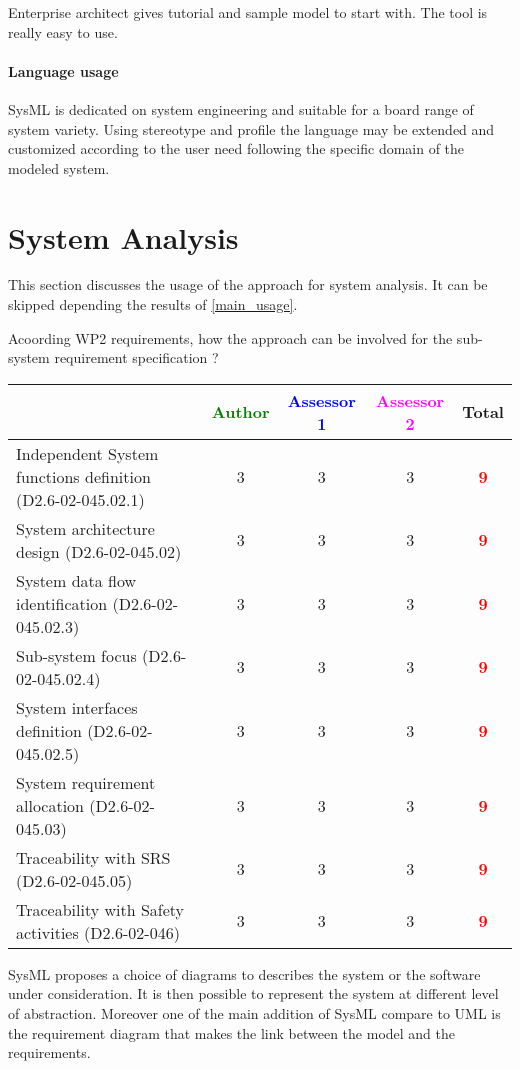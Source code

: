 Enterprise architect gives tutorial and sample model to start
with. The tool is really easy to use.

\paragraph{Language usage} 
SysML is dedicated on system engineering and suitable for a board range of
system variety. Using stereotype and profile the language may be
extended and customized according to the user need following the
specific domain of the modeled system.


\section{System Analysis}
This section discusses the usage of the approach for system analysis.
It can be skipped depending the results of \ref{main_usage}.

Acoording WP2 requirements, how the approach can be involved for the sub-system requirement specification ?

\begin{tabular}{|l | c | c | c | c|}
\hline
& \textcolor{green}{Author} & \textcolor{blue}{Assessor 1} & \textcolor{magenta}{Assessor 2} & Total \\
\hline
Independent System functions definition (D2.6-02-045.02.1)  &3 & 3   & 3    & \textcolor{red}{\textbf{9}} \\
\hline 
System architecture design (D2.6-02-045.02) &3 & 3   & 3   & \textcolor{red}{\textbf{9}} \\
\hline
System data flow identification (D2.6-02-045.02.3)  &3 & 3   & 3   & \textcolor{red}{\textbf{9}} \\
\hline
Sub-system focus (D2.6-02-045.02.4)  &3 & 3   & 3   & \textcolor{red}{\textbf{9}} \\
\hline
System interfaces definition (D2.6-02-045.02.5)  &3 & 3   & 3   & \textcolor{red}{\textbf{9}} \\
\hline
System requirement allocation (D2.6-02-045.03)  &3 & 3   & 3   & \textcolor{red}{\textbf{9}}  \\
\hline
Traceability with SRS (D2.6-02-045.05)  &3 & 3   & 3   & \textcolor{red}{\textbf{9}}  \\
\hline
Traceability with Safety activities (D2.6-02-046)  &3 & 3   & 3   & \textcolor{red}{\textbf{9}} \\
\hline
\end{tabular}
\begin{author_comment}
  SysML proposes a choice of diagrams to describes the system or the
  software under consideration. It is then possible to represent the
  system at different level of abstraction. Moreover one of the main
  addition of SysML compare to UML is the requirement diagram that
  makes the link between the model and the requirements.
\end{author_comment}


